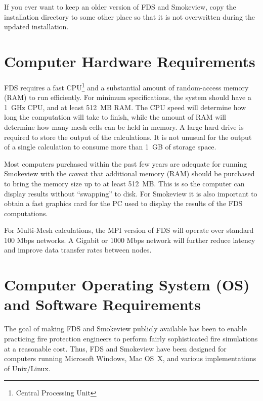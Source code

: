 \documentclass[11pt]{book}
\begin{document}
\begin{warning}
\noindent
If you ever want to keep an older version of FDS and Smokeview, copy the installation directory to some other
place so that it is not overwritten during the updated installation.
\end{warning}

\section{Computer Hardware Requirements}

FDS requires a fast CPU\footnote{Central Processing Unit} and a substantial amount of random-access memory (RAM) to run efficiently.
For minimum specifications, the system should have a 1~GHz CPU, and at least 512~MB RAM.
The CPU speed will determine how long the computation will take to finish, while the amount
of RAM will determine how many mesh cells can be held in memory.
A large hard drive is required to store the output of the calculations. It is not unusual for
the output of a single calculation to consume more than 1~GB of storage space.

Most computers purchased within the past few years are adequate for running Smokeview
with the caveat that additional memory (RAM) should be purchased to bring the
memory size up to at least 512~MB. This is so the computer can display results without
``swapping'' to disk. For Smokeview it is also important to obtain a fast graphics card
for the PC used to display the results of the FDS computations.

For Multi-Mesh calculations, the MPI version of FDS will operate over standard 100 Mbps networks.
A Gigabit or 1000 Mbps network will further reduce latency and improve data transfer rates between nodes.


\section{Computer Operating System (OS) and Software Requirements}

The goal of making FDS and Smokeview publicly available has been to enable
practicing fire protection engineers to perform fairly sophisticated
fire simulations at a reasonable cost. Thus, FDS and Smokeview have been
designed for computers running Microsoft Windows, Mac OS~X, and various
implementations of Unix/Linux.
\end{document}
